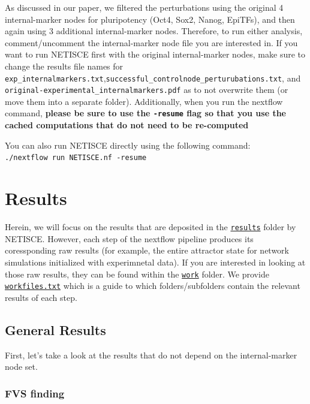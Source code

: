 \documentclass[
]{book}
\begin{document}
As discussed in our paper, we filtered the perturbations using the original 4 internal-marker nodes for pluripotency (Oct4, Sox2, Nanog, EpiTFs), and then again using 3 additional internal-marker nodes. Therefore, to run either analysis, comment/uncomment the internal-marker node file you are interested in. If you want to run NETISCE first with the original internal-marker nodes, make sure to change the results file names for \texttt{exp\_internalmarkers.txt},\texttt{successful\_controlnode\_perturubations.txt}, and \texttt{original-experimental\_internalmarkers.pdf} as to not overwrite them (or move them into a separate folder). Additionally, when you run the nextflow command, \textbf{please be sure to use the \texttt{-resume} flag so that you use the cached computations that do not need to be re-computed}

You can also run NETISCE directly using the following command: \texttt{./nextflow\ run\ NETISCE.nf\ -resume}

\hypertarget{results-1}{%
\section{Results}\label{results-1}}

Herein, we will focus on the results that are deposited in the \href{https://github.com/VeraLiconaResearchGroup/Netisce/tree/main/ipsc_validation/results}{\texttt{results}} folder by NETISCE. However, each step of the nextflow pipeline produces its coressponding raw results (for example, the entire attractor state for network simulations initialized with experimnetal data). If you are interested in looking at those raw results, they can be found within the \href{https://github.com/VeraLiconaResearchGroup/Netisce/tree/main/ipsc_validation/work}{\texttt{work}} folder. We provide \href{https://github.com/VeraLiconaResearchGroup/Netisce/blob/main/ipsc_validation/workfiles.txt}{\texttt{workfiles.txt}} which is a guide to which folders/subfolders contain the relevant results of each step.

\hypertarget{general-results}{%
\subsection{General Results}\label{general-results}}

First, let's take a look at the results that do not depend on the internal-marker node set.

\hypertarget{section-id}{%
\subsubsection*{FVS finding}\label{section-id}}
\end{document}
